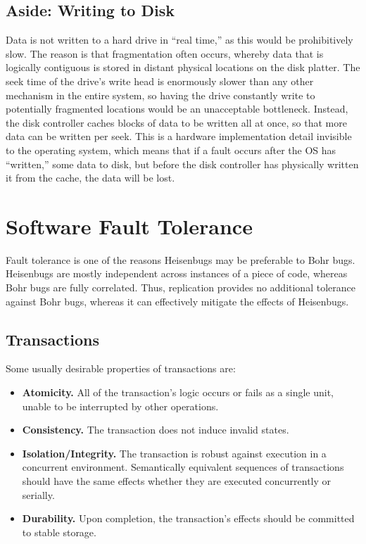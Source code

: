 \documentclass[twoside]{article}
\begin{document}
\subsection{Aside: Writing to Disk}
Data is not written to a hard drive in ``real time,'' as this would be prohibitively slow.
The reason is that fragmentation often occurs, whereby data that is logically contiguous is stored in distant physical locations on the disk platter.
The seek time of the drive's write head is enormously slower than any other mechanism in the entire system, so having the drive constantly write to potentially fragmented locations would be an unacceptable bottleneck.
Instead, the disk controller caches blocks of data to be written all at once, so that more data can be written per seek.
This is a hardware implementation detail invisible to the operating system, which means that if a fault occurs after the OS has ``written,'' some data to disk, but before the disk controller has physically written it from the cache, the data will be lost.

\section{Software Fault Tolerance}
Fault tolerance is one of the reasons Heisenbugs may be preferable to Bohr bugs.
Heisenbugs are mostly independent across instances of a piece of code, whereas Bohr bugs are fully correlated.
Thus, replication provides no additional tolerance against Bohr bugs, whereas it can effectively mitigate the effects of Heisenbugs.

\subsection{Transactions}
Some usually desirable properties of transactions are:

\begin{itemize}
  \item \textbf{Atomicity.} All of the transaction's logic occurs or fails as a single unit, unable to be interrupted by other operations.
  \item \textbf{Consistency.} The transaction does not induce invalid states.
  \item \textbf{Isolation/Integrity.} The transaction is robust against execution in a concurrent environment. Semantically equivalent sequences of transactions should have the same effects whether they are executed concurrently or serially.
  \item \textbf{Durability.} Upon completion, the transaction's effects should be committed to stable storage.
\end{itemize}
\end{document}
